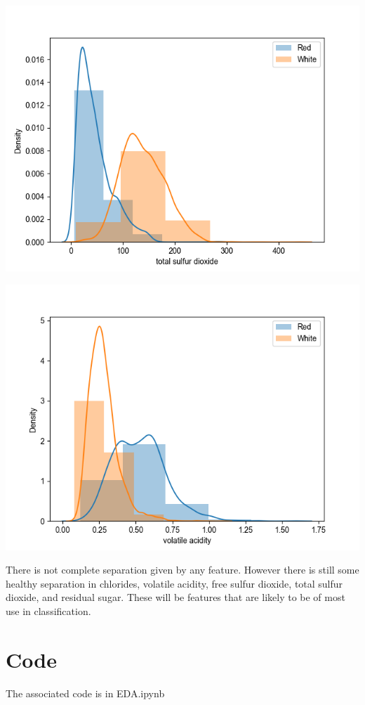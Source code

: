 \documentclass[12pt, letterpaper]{article}
\begin{document}
\includegraphics[scale=\myscale]{class_dist_total_sulfur_dioxide.png}

\includegraphics[scale=\myscale]{class_dist_volatile_acidity.png}

There is not complete separation given by any feature. However there is still some healthy separation in chlorides, volatile acidity, free sulfur dioxide, total sulfur dioxide, and residual sugar. These will be features that are likely to be of most use in classification.


\section{Code} %

The associated code is in EDA.ipynb
\end{document}

